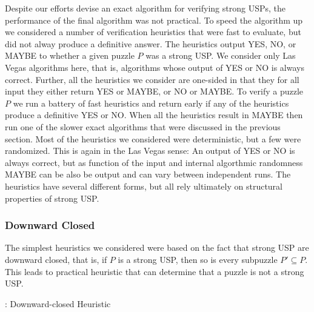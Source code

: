 \documentclass[11pt]{article}
\newcommand\sse{\subseteq}
\begin{document}
Despite our efforts devise an exact algorithm for verifying strong
USPs, the performance of the final algorithm was not practical.  To
speed the algorithm up we considered a number of verification
heuristics that were fast to evaluate, but did not alway produce a
definitive answer.  The heuristics output YES, NO, or MAYBE to whether
a given puzzle $P$ was a strong USP.  We consider only Las Vegas
algorithms here, that is, algorithms whose output of YES or NO is
always correct.  Further, all the heuristics we consider are one-sided
in that they for all input they either return YES or MAYBE, or NO or
MAYBE.  To verify a puzzle $P$ we run a battery of fast heuristics and
return early if any of the heuristics produce a definitive YES or NO.
When all the heuristics result in MAYBE then run one of the slower
exact algorithms that were discussed in the previous section.  Most of
the heuristics we considered were deterministic, but a few were
randomized.  This is again in the Las Vegas sense: An output of YES or
NO is always correct, but as function of the input and internal
algorthmic randomness MAYBE can be also be output and can vary between
independent runs.  The heuristics have several different forms, but
all rely ultimately on structural properties of strong USP.

\subsubsection{Downward Closed}

The simplest heuristics we considered were based on the fact that
strong USP are downward closed, that is, if $P$ is a strong USP, then
so is every subpuzzle $P' \sse P$.  This leads to practical heuristic
that can determine that a puzzle is not a strong USP.

\begin{algorithm}
  \caption{: Downward-closed Heuristic}
  \label{alg:downward-closed}
\begin{algorithmic}[1]
  \For{$P' \sse P, |P'| = s'$}
        \EndIf
  \EndFor{}
\end{algorithmic}
\end{algorithm}
\end{document}

